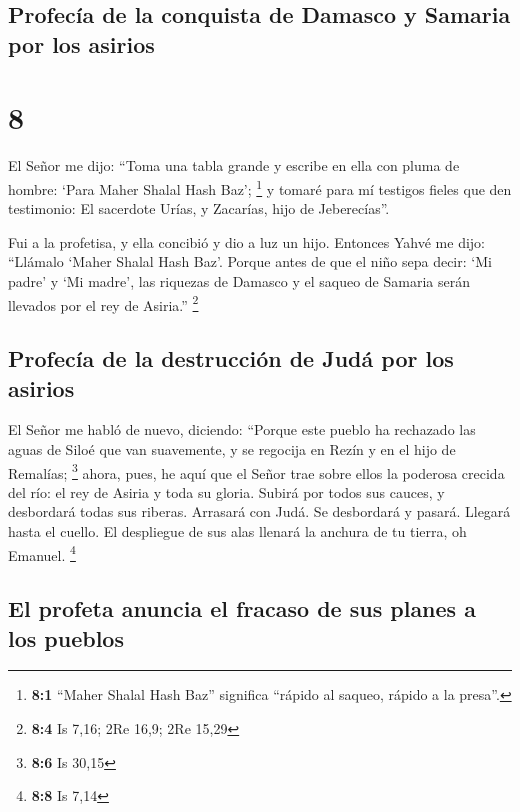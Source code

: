 \hypertarget{profecuxeda-de-la-conquista-de-damasco-y-samaria-por-los-asirios}{%
\subsection{Profecía de la conquista de Damasco y Samaria por los
asirios}\label{profecuxeda-de-la-conquista-de-damasco-y-samaria-por-los-asirios}}

\hypertarget{section-7}{%
\section{8}\label{section-7}}

 El Señor me dijo: ``Toma una tabla grande y escribe en
ella con pluma de hombre: `Para Maher Shalal Hash Baz'; \footnote{\textbf{8:1}
  ``Maher Shalal Hash Baz'' significa ``rápido al saqueo, rápido a la
  presa''.}  y tomaré para mí testigos fieles que den
testimonio: El sacerdote Urías, y Zacarías, hijo de Jeberecías''.

 Fui a la profetisa, y ella concibió y dio a luz un hijo.
Entonces Yahvé me dijo: ``Llámalo `Maher Shalal Hash Baz'.
 Porque antes de que el niño sepa decir: `Mi padre' y `Mi
madre', las riquezas de Damasco y el saqueo de Samaria serán llevados
por el rey de Asiria.'' \footnote{\textbf{8:4} Is 7,16; 2Re 16,9; 2Re
  15,29}

\hypertarget{profecuxeda-de-la-destrucciuxf3n-de-juduxe1-por-los-asirios}{%
\subsection{Profecía de la destrucción de Judá por los
asirios}\label{profecuxeda-de-la-destrucciuxf3n-de-juduxe1-por-los-asirios}}

 El Señor me habló de nuevo, diciendo: 
``Porque este pueblo ha rechazado las aguas de Siloé que van suavemente,
y se regocija en Rezín y en el hijo de Remalías; \footnote{\textbf{8:6}
  Is 30,15}  ahora, pues, he aquí que el Señor trae sobre
ellos la poderosa crecida del río: el rey de Asiria y toda su gloria.
Subirá por todos sus cauces, y desbordará todas sus riberas.
 Arrasará con Judá. Se desbordará y pasará. Llegará hasta
el cuello. El despliegue de sus alas llenará la anchura de tu tierra, oh
Emanuel. \footnote{\textbf{8:8} Is 7,14}

\hypertarget{el-profeta-anuncia-el-fracaso-de-sus-planes-a-los-pueblos}{%
\subsection{El profeta anuncia el fracaso de sus planes a los
pueblos}\label{el-profeta-anuncia-el-fracaso-de-sus-planes-a-los-pueblos}}

